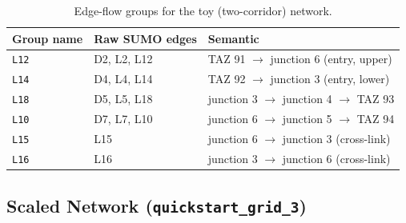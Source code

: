 \documentclass[11pt]{article}
\begin{document}
\begin{table}[h]
\centering
\caption{Edge-flow groups for the toy (two-corridor) network.}
\label{tab:groups_toy}
\begin{tabular}{lll}
\hline
\textbf{Group name} & \textbf{Raw SUMO edges} & \textbf{Semantic} \\
\hline
\texttt{L12}  & D2, L2, L12         & TAZ 91 $\to$ junction 6 (entry, upper) \\
\texttt{L14}  & D4, L4, L14         & TAZ 92 $\to$ junction 3 (entry, lower) \\
\texttt{L18}  & D5, L5, L18         & junction 3 $\to$ junction 4 $\to$ TAZ 93 \\
\texttt{L10}  & D7, L7, L10         & junction 6 $\to$ junction 5 $\to$ TAZ 94 \\
\texttt{L15}  & L15                 & junction 6 $\to$ junction 3 (cross-link) \\
\texttt{L16}  & L16                 & junction 3 $\to$ junction 6 (cross-link) \\
\hline
\end{tabular}
\end{table}







\subsection{Scaled Network (\texttt{quickstart\_grid\_3})}
\label{app:network_grid3}
\end{document}
